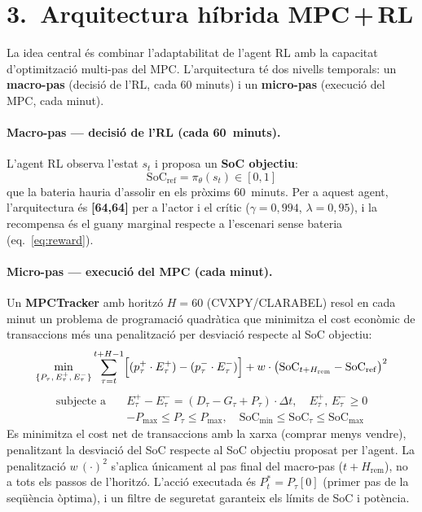 \documentclass[a4paper,11pt]{article}
\begin{document}
\section*{3.\ Arquitectura híbrida MPC\,+\,RL}

La idea central és combinar l'adaptabilitat de l'agent RL amb la capacitat
d'optimització multi-pas del MPC. L'arquitectura té dos nivells temporals:
un \textbf{macro-pas} (decisió de l'RL, cada 60 minuts) i un
\textbf{micro-pas} (execució del MPC, cada minut).

\paragraph{Macro-pas — decisió de l'RL (cada 60~minuts).}
L'agent RL observa l'estat $s_t$ i proposa un \textbf{SoC objectiu}:
\begin{equation}
  \mathrm{SoC}_{\mathrm{ref}} = \pi_\theta(s_t) \in [0,1]
\end{equation}
que la bateria hauria d'assolir en els pròxims 60~minuts.
Per a aquest agent, l'arquitectura és \textbf{[64,64]} per a l'actor i
el crític ($\gamma=0{,}994$, $\lambda=0{,}95$), i la recompensa és el
guany marginal respecte a l'escenari sense bateria
(eq.~\eqref{eq:reward}).

\paragraph{Micro-pas — execució del MPC (cada minut).}
Un \textbf{MPCTracker} amb horitzó $H=60$ (CVXPY/CLARABEL) resol en cada
minut un problema de programació quadràtica que minimitza el cost econòmic
de transaccions més una penalització per desviació respecte al SoC objectiu:
\begin{equation}
  \min_{\{P_\tau,\,E^+_\tau,\,E^-_\tau\}}
  \sum_{\tau=t}^{t+H-1}
  \Bigl[(p^+_\tau \cdot E^+_\tau) - (p^-_\tau \cdot E^-_\tau)\Bigr]
  + w\cdot\bigl(\mathrm{SoC}_{t+H_{\mathrm{rem}}} - \mathrm{SoC}_{\mathrm{ref}}\bigr)^2
\end{equation}
\begin{align*}
  \text{subjecte a}\quad
  & E^+_\tau - E^-_\tau = (D_\tau - G_\tau + P_\tau)\cdot\Delta t,
    \quad E^+_\tau,\,E^-_\tau \geq 0\\
  & -P_{\max} \leq P_\tau \leq P_{\max},\quad
    \mathrm{SoC}_{\min} \leq \mathrm{SoC}_\tau \leq \mathrm{SoC}_{\max}
\end{align*}
Es minimitza el cost net de transaccions amb la xarxa (comprar menys vendre),
penalitzant la desviació del SoC respecte al SoC objectiu proposat per l'agent.
La penalització $w\,(\cdot)^2$ s'aplica únicament al pas final del macro-pas
($t+H_{\mathrm{rem}}$), no a tots els passos de l'horitzó.
L'acció executada és $P_t^* = P_\tau[0]$ (primer pas de la seqüència òptima),
i un filtre de seguretat garanteix els límits de SoC i potència.
\end{document}
